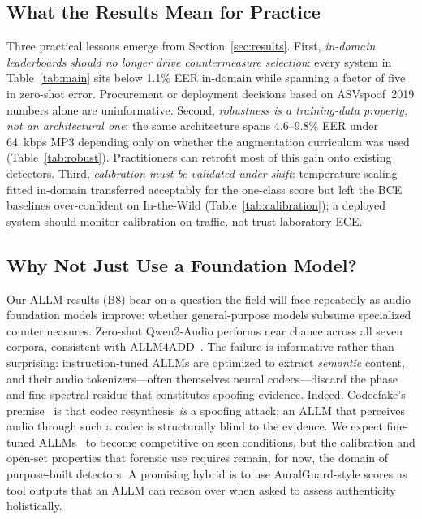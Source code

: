 
\subsection{What the Results Mean for Practice}

Three practical lessons emerge from Section~\ref{sec:results}. First, \emph{in-domain
leaderboards should no longer drive countermeasure selection}: every system in
Table~\ref{tab:main} sits below 1.1\% EER in-domain while spanning a factor of five in
zero-shot error. Procurement or deployment decisions based on ASVspoof~2019 numbers
alone are uninformative. Second, \emph{robustness is a training-data property, not an
architectural one}: the same architecture spans 4.6--9.8\% EER under 64~kbps MP3
depending only on whether the augmentation curriculum was used
(Table~\ref{tab:robust}). Practitioners can retrofit most of this gain onto existing
detectors. Third, \emph{calibration must be validated under shift}: temperature scaling
fitted in-domain transferred acceptably for the one-class score but left the BCE
baselines over-confident on In-the-Wild (Table~\ref{tab:calibration}); a deployed
system should monitor calibration on traffic, not trust laboratory ECE.

\subsection{Why Not Just Use a Foundation Model?}

Our ALLM results (B8) bear on a question the field will face repeatedly as audio
foundation models improve: whether general-purpose models subsume specialized
countermeasures. Zero-shot Qwen2-Audio performs near chance across all seven corpora,
consistent with ALLM4ADD~\cite{gong2025allm4add}. The failure is informative rather
than surprising: instruction-tuned ALLMs are optimized to extract \emph{semantic}
content, and their audio tokenizers---often themselves neural codecs---discard the
phase and fine spectral residue that constitutes spoofing evidence. Indeed, Codecfake's
premise~\cite{xie2025codecfake} is that codec resynthesis \emph{is} a spoofing attack;
an ALLM that perceives audio through such a codec is structurally blind to the
evidence. We expect fine-tuned ALLMs~\cite{gong2025allm4add} to become competitive on
seen conditions, but the calibration and open-set properties that forensic use requires
remain, for now, the domain of purpose-built detectors. A promising hybrid is to use
AuralGuard-style scores as tool outputs that an ALLM can reason over when asked to
assess authenticity holistically.

